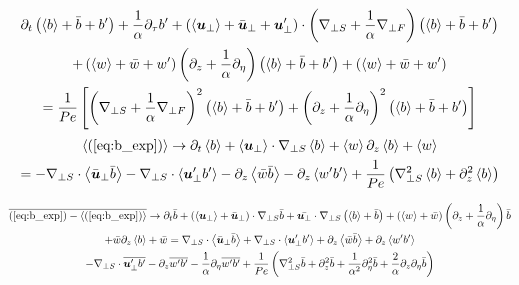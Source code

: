 \documentclass{article}
\begin{document}
\begin{multline}
    \partial_t\left(\left<b\right> + \bar{b} + b'\right) +
    \frac{1}{\alpha}\partial_{\tau}b' + \left(\left<\boldsymbol{u}_{\perp}\right> + \bar{\boldsymbol{u}}_{\perp} + \boldsymbol{u}'_{\perp}\right)\cdot\left(\nabla_{\perp S} +
    \frac{1}{\alpha}\nabla_{\perp F}\right)\left(\left<b\right> + \bar{b} + b'\right) 
    \\+ \left(\left<w\right> + \bar{w} + w'\right)\left(\partial_z +
    \frac{1}{\alpha}\partial_{\eta}\right)\left(\left<b\right> + \bar{b} + b'\right) + \left(\left<w\right> + \bar{w} + w'\right) \label{eq:b_exp}
    \\
     = \frac{1}{Pe}\left[\left(\nabla_{\perp S} + \frac{1}{\alpha}\nabla_{\perp F}\right)^2
    \left(\left<b\right> + \bar{b} + b'\right) + \left(\partial_z +
    \frac{1}{\alpha}\partial_{\eta}\right)^2\left(\left<b\right> + \bar{b} + b'\right)\right]
\end{multline}
\begin{multline}
    \left<(\ref{eq:b_exp})\right> \to \partial_t \left<b\right> +
    \left<\boldsymbol{u}_{\perp}\right>\cdot\nabla_{\perp S}\left<b\right> 
     + \left<w\right>\partial_z\left<b\right> 
     + \left<w\right>
     \\
    = -\nabla_{\perp S}\cdot\left<\bar{\boldsymbol{u}}_{\perp} \bar{b}\right> -
    \nabla_{\perp S}\cdot\left<\boldsymbol{u}'_{\perp} b'\right>-\partial_z\left<\bar{w}\bar{b}\right> - \partial_z\left<w'b'\right>
    + \frac{1}{Pe}\left(\nabla_{\perp S}^2\left<b\right> + \partial_z^2\left<b\right>\right) 
    \label{eq:b_bracket_eq}
\end{multline}

\begin{multline}
    \overline{(\ref{eq:b_exp}) - \left<(\ref{eq:b_exp})\right>} \to \partial_t \bar{b} +
    \left(\left<\boldsymbol{u}_{\perp}\right> + \bar{\boldsymbol{u}}_{\perp}\right)\cdot\nabla_{\perp S} \bar{b} +
    \bar{\boldsymbol{u}_{\perp}} \cdot\nabla_{\perp S}\left(\left<b\right> + \bar{b}\right) +
    \left(\left<w\right> + \bar{w}\right)\left(\partial_z +
    \frac{1}{\alpha}\partial_{\eta}\right)\bar{b} 
    \\
    + \bar{w}\partial_z\left<b\right> + \bar{w} 
    = \nabla_{\perp S}\cdot\left<\bar{\boldsymbol{u}}_{\perp}\bar{b}\right>+ 
    \nabla_{\perp S}\cdot\left<\boldsymbol{u}_{\perp}'b'\right> + \partial_z\left<\bar{w}\bar{b}\right> +
    \partial_z\left<w'b'\right> 
    \\
    - \nabla_{\perp S}\cdot\overline{\boldsymbol{u}_{\perp}'b'} -
    \partial_z\overline{w'b'} - \frac{1}{\alpha}\partial_{\eta}\overline{w'b'} +
    \frac{1}{Pe}\left(\nabla_{\perp S}^2\bar{b} + \partial_z^2\bar{b} +
    \frac{1}{\alpha^2}\partial_{\eta}^2\bar{b} +
    \frac{2}{\alpha}\partial_z\partial_{\eta}\bar{b}\right)
    \label{eq:b_bar_eq}
\end{multline}
\end{document}
